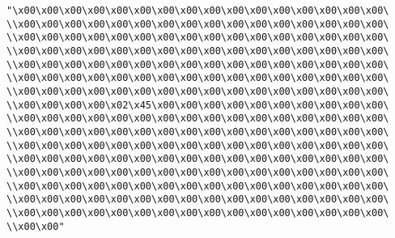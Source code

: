 \verb|"\x00\x00\x00\x00\x00\x00\x00\x00\x00\x00\x00\x00\x00\x00\x00\x00\|\newline
\verb|\\x00\x00\x00\x00\x00\x00\x00\x00\x00\x00\x00\x00\x00\x00\x00\x00\|\newline
\verb|\\x00\x00\x00\x00\x00\x00\x00\x00\x00\x00\x00\x00\x00\x00\x00\x00\|\newline
\verb|\\x00\x00\x00\x00\x00\x00\x00\x00\x00\x00\x00\x00\x00\x00\x00\x00\|\newline
\verb|\\x00\x00\x00\x00\x00\x00\x00\x00\x00\x00\x00\x00\x00\x00\x00\x00\|\newline
\verb|\\x00\x00\x00\x00\x00\x00\x00\x00\x00\x00\x00\x00\x00\x00\x00\x00\|\newline
\verb|\\x00\x00\x00\x00\x00\x00\x00\x00\x00\x00\x00\x00\x00\x00\x00\x00\|\newline
\verb|\\x00\x00\x00\x00\x02\x45\x00\x00\x00\x00\x00\x00\x00\x00\x00\x00\|\newline
\verb|\\x00\x00\x00\x00\x00\x00\x00\x00\x00\x00\x00\x00\x00\x00\x00\x00\|\newline
\verb|\\x00\x00\x00\x00\x00\x00\x00\x00\x00\x00\x00\x00\x00\x00\x00\x00\|\newline
\verb|\\x00\x00\x00\x00\x00\x00\x00\x00\x00\x00\x00\x00\x00\x00\x00\x00\|\newline
\verb|\\x00\x00\x00\x00\x00\x00\x00\x00\x00\x00\x00\x00\x00\x00\x00\x00\|\newline
\verb|\\x00\x00\x00\x00\x00\x00\x00\x00\x00\x00\x00\x00\x00\x00\x00\x00\|\newline
\verb|\\x00\x00\x00\x00\x00\x00\x00\x00\x00\x00\x00\x00\x00\x00\x00\x00\|\newline
\verb|\\x00\x00\x00\x00\x00\x00\x00\x00\x00\x00\x00\x00\x00\x00\x00\x00\|\newline
\verb|\\x00\x00\x00\x00\x00\x00\x00\x00\x00\x00\x00\x00\x00\x00\x00\x00\|\newline
\verb|\\x00\x00"|\newline
